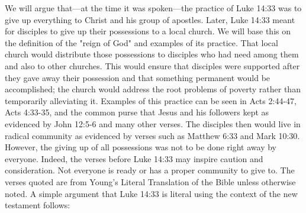\documentclass[11pt]{article}
\begin{document}
We will argue that---at the time it was spoken---the practice of Luke 14:33 was to give up everything to Christ and his group of apostles. Later, Luke 14:33 meant for disciples to give up their possessions to a local church. We will base this on the definition of the "reign of God" and examples of its practice. That local church would distribute those possessions to disciples who had need among them and also to other churches. This would ensure that disciples were supported after they gave away their possession and that something permanent would be accomplished; the church would address the root problems of poverty rather than temporarily alleviating it. Examples of this practice can be seen in Acts 2:44-47, Acts 4:33-35, and the common purse that Jesus and his followers kept as evidenced by John 12:5-6 and many other verses. The disciples then would live in radical community as evidenced by verses such as Matthew 6:33 and Mark 10:30. However, the giving up of all possessions was not to be done right away by everyone. Indeed, the verses before Luke 14:33 may inspire caution and consideration. Not everyone is ready or has a proper community to give to. The verses quoted are from Young's Literal Translation of the Bible unless otherwise noted. A simple argument that Luke 14:33 is literal using the context of the new testament follows:
\end{document}
